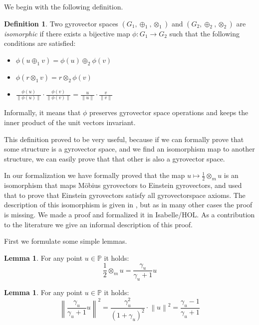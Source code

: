 \documentclass[a4paper]{article}
\theoremstyle{definition}
\newtheorem{definition}{Definition}[section]
\newtheorem{lemma}[theorem]{Lemma}
\newcommand{\norm}[1]{\left\lVert#1\right\rVert}
\begin{document}
We begin with the following definition.

\begin{definition}
  Two gyrovector spaces $(G_1, \oplus_1, \otimes_1)$ and
  $(G_2, \oplus_2, \otimes_2)$ are \emph{isomorphic} if there exists a
  bijective map $\phi: G_1 \rightarrow G_2$ such that the following
  conditions are satisfied:
\begin{itemize}
    \item $\phi(u\oplus_1 v) = \phi(u)\oplus_2 \phi(v)$
    \item $\phi(r\otimes_1 v) = r\otimes_2 \phi(v)$
    \item
      $\frac{\phi(u)}{\parallel \phi(u) \parallel}\cdot
      \frac{\phi(v)}{\parallel \phi(v)\parallel} = \frac{u}{\parallel
        u \parallel}\cdot \frac{v}{\parallel v \parallel}$
\end{itemize}
\end{definition}

Informally, it means that $\phi$ preserves gyrovector space operations
and keeps the inner product of the unit vectors invariant.

This definition proved to be very useful, because if we can formally
prove that some structure is a gyrovector space, and we find an
isomorphism map to another structure, we can easily prove that that
other is also a gyrovector space.

In our formalization we have formally proved that the map
$u \mapsto \frac{1}{2}\otimes_m u$ is an isomorphism that maps
M\"obius gyrovectors to Einstein gyrovectors, and used that to prove
that Einstein gyrovectors satisfy all gyrovectorspace axioms. The
description of this isomorphism is given in \cite{ungar-analytic}, but
as in many other cases the proof is missing. We made a proof and
formalized it in Isabelle/HOL. As a contribution to the literature we
give an informal description of this proof.

First we formulate some simple lemmas.

\begin{lemma}\label{lemma:halfgamma}
  For any point $u \in \mathbb{P}$ it holds:
  $$\frac{1}{2}\otimes_m u = \frac{\gamma_u}{\gamma_u + 1} u$$
\end{lemma}

\begin{lemma}\label{lemma:normhalfsquared}
  For any point $u \in \mathbb{P}$ it holds:
  $$\norm{\frac{\gamma_u}{\gamma_u+1}u}^2 =\frac{\gamma_u^2}{(1+\gamma_u)^2}\cdot\norm{u}^2 = \frac{\gamma_u-1}{\gamma_u+1}$$
\end{lemma}
\end{document}
